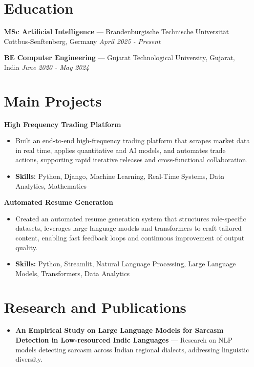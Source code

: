 \documentclass[a4paper,10pt]{article}
\begin{document}
\section*{Education}
\textbf{MSc Artificial Intelligence} — Brandenburgische Technische Universität Cottbus-Senftenberg, Germany \hfill \textit{April 2025 - Present}\par
\vspace{1.5pt}
\textbf{BE Computer Engineering} — Gujarat Technological University, Gujarat, India \hfill \textit{June 2020 - May 2024}\par

\section*{Main Projects}
\textbf{High Frequency Trading Platform}\par
\vspace{1pt}
\begin{itemize}
  \item Built an end-to-end high-frequency trading platform that scrapes market data in real time, applies quantitative and AI models, and automates trade actions, supporting rapid iterative releases and cross-functional collaboration.
  \item \textbf{Skills:} Python, Django, Machine Learning, Real-Time Systems, Data Analytics, Mathematics
\end{itemize}
\vspace{3pt}
\textbf{Automated Resume Generation}\par
\vspace{1pt}
\begin{itemize}
  \item Created an automated resume generation system that structures role-specific datasets, leverages large language models and transformers to craft tailored content, enabling fast feedback loops and continuous improvement of output quality.
  \item \textbf{Skills:} Python, Streamlit, Natural Language Processing, Large Language Models, Transformers, Data Analytics
\end{itemize}

\section*{Research and Publications}
\begin{itemize}
\item \textbf{An Empirical Study on Large Language Models for Sarcasm Detection in Low-resourced Indic Languages} — Research on NLP models detecting sarcasm across Indian regional dialects, addressing linguistic diversity.
\end{itemize}
\end{document}
